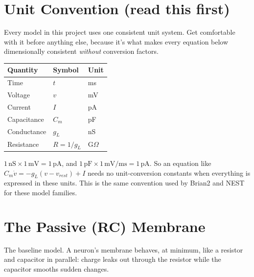 \documentclass[11pt,a4paper]{article}
\begin{document}
	\vspace{0.2cm}
	
		\newpage
	\tableofcontents
	
	\newpage

\section{Unit Convention (read this first)}
Every model in this project uses one consistent unit system. Get comfortable with it before anything else, because it's what makes every equation below dimensionally consistent \emph{without} conversion factors.

\begin{center}
\begin{tabular}{@{}lll@{}}
\toprule
\textbf{Quantity} & \textbf{Symbol} & \textbf{Unit} \\
\midrule
Time & $t$ & ms \\
Voltage & $v$ & mV \\
Current & $I$ & pA \\
Capacitance & $C_m$ & pF \\
Conductance & $g_L$ & nS \\
Resistance & $R = 1/g_L$ & G$\Omega$ \\
\bottomrule
\end{tabular}
\end{center}

\begin{keybox}
$1\,\text{nS} \times 1\,\text{mV} = 1\,\text{pA}$, and $1\,\text{pF} \times 1\,\text{mV/ms} = 1\,\text{pA}$. So an equation like $C_m \dot v = -g_L(v-v_{rest}) + I$ needs no unit-conversion constants when everything is expressed in these units. This is the same convention used by Brian2 and NEST for these model families.
\end{keybox}

\section{The Passive (RC) Membrane}
The baseline model. A neuron's membrane behaves, at minimum, like a resistor and capacitor in parallel: charge leaks out through the resistor while the capacitor smooths sudden changes.
\end{document}
